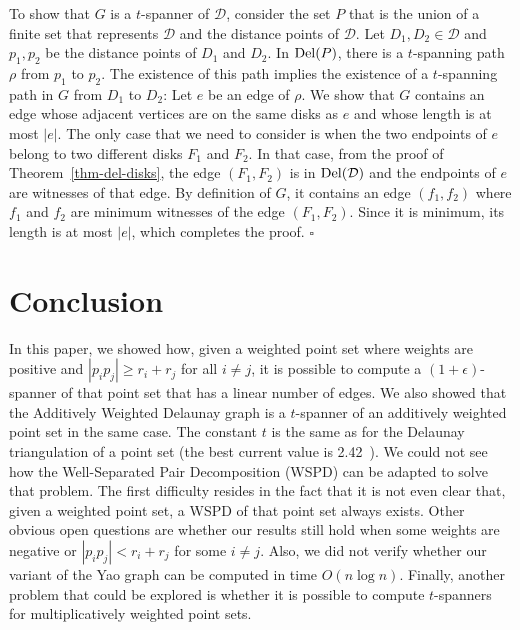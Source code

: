 \documentclass[pdftex,leqno,fleqn,12pt]{article}
\newcommand{\DEL}{{\rm{Del}}}
\newenvironment{proof}{{\textit Proof:} \rm}{\hfill $\square$ \medskip\\}
\begin{document}
{\begin{proof}
To show that $G$ is a $t$-spanner of $\mathcal{D}$, consider the set $P$ that is the union of a
finite set that represents $\mathcal{D}$ and the distance points of $\mathcal{D}$. Let
$D_1,D_2\in\mathcal{D}$ and $p_1,p_2$ be the distance points of $D_1$ and $D_2$. In $\DEL(P)$,
there is a $t$-spanning path $\rho$ from $p_1$ to $p_2$. The existence of this path implies the
existence of a $t$-spanning path in $G$ from $D_1$ to $D_2$: Let $e$ be an edge of $\rho$. We show
that $G$ contains an edge whose adjacent vertices are on the same disks as $e$ and whose length is
at most $|e|$. The only case that we need to consider is when the two endpoints of $e$ belong to
two different disks $F_1$ and $F_2$. In that case, from the proof of Theorem~\ref{thm-del-disks},
the edge $(F_1,F_2)$ is in $\DEL(\mathcal{D})$ and the endpoints of $e$ are witnesses of that edge.
By definition of $G$, it contains an edge $(f_1,f_2)$ where $f_1$ and $f_2$ are minimum witnesses
of the edge $(F_1,F_2)$. Since it is minimum, its length is at most $|e|$, which completes the
proof.
\end{proof}

}

\section{Conclusion}\label{section-disk-del-conclusion}

In this paper, we showed how, given a weighted point set where weights are positive and
$|p_ip_j|\geq r_i+r_j$ for all $i\neq j$, it is possible to compute a $(1+\epsilon)$-spanner of
that point set that has a linear number of edges. We also showed that the Additively Weighted
Delaunay graph is a $t$-spanner of an additively weighted point set in the same case. The constant
$t$ is the same as for the Delaunay triangulation of a point set (the best current value is
2.42~\cite{keil92}). We could not see how the Well-Separated Pair Decomposition (WSPD) can be
adapted to solve that problem. The first difficulty resides in the fact that it is not even clear
that, given a weighted point set, a WSPD of that point set always exists. Other obvious open
questions are whether our results still hold when some weights are negative or $|p_ip_j|< r_i+r_j$
for some $i\neq j$. Also, we did not verify whether our variant of the Yao graph can be computed in
time $O(n\log n)$. Finally, another problem that could be explored is whether it is possible to
compute $t$-spanners for multiplicatively weighted point sets.



\end{document}
